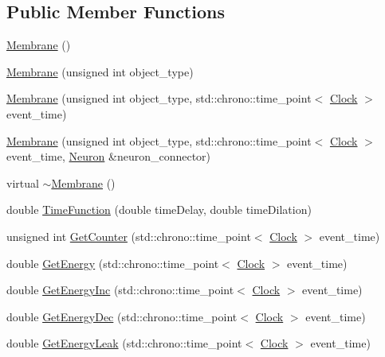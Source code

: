 \subsection*{Public Member Functions}
\begin{DoxyCompactItemize}
\item 
\hyperlink{class_membrane_ae3db1e55d9a535226bfd41c2a9ac1f0c}{Membrane} ()
\item 
\hyperlink{class_membrane_a9e45fcb5a4e791f2697fce4d9fa78a3f}{Membrane} (unsigned int object\+\_\+type)
\item 
\hyperlink{class_membrane_afeb8292866a69bdc2b9be6dcd902b519}{Membrane} (unsigned int object\+\_\+type, std\+::chrono\+::time\+\_\+point$<$ \hyperlink{universe_8h_a0ef8d951d1ca5ab3cfaf7ab4c7a6fd80}{Clock} $>$ event\+\_\+time)
\item 
\hyperlink{class_membrane_a8d61894d90a7f63e427cd8b1a5eca380}{Membrane} (unsigned int object\+\_\+type, std\+::chrono\+::time\+\_\+point$<$ \hyperlink{universe_8h_a0ef8d951d1ca5ab3cfaf7ab4c7a6fd80}{Clock} $>$ event\+\_\+time, \hyperlink{class_neuron}{Neuron} \&neuron\+\_\+connector)
\item 
virtual \hyperlink{class_membrane_a8765daf8038c1e992e3ea3752db0042f}{$\sim$\+Membrane} ()
\item 
double \hyperlink{class_membrane_a8c3593b0747495c412bf2d99b7b10104}{Time\+Function} (double time\+Delay, double time\+Dilation)
\item 
unsigned int \hyperlink{class_membrane_a85f8b2633ff32f79b6fbb466ce690858}{Get\+Counter} (std\+::chrono\+::time\+\_\+point$<$ \hyperlink{universe_8h_a0ef8d951d1ca5ab3cfaf7ab4c7a6fd80}{Clock} $>$ event\+\_\+time)
\item 
double \hyperlink{class_membrane_a50d39c596daa7af8da7dd7215d3a32ba}{Get\+Energy} (std\+::chrono\+::time\+\_\+point$<$ \hyperlink{universe_8h_a0ef8d951d1ca5ab3cfaf7ab4c7a6fd80}{Clock} $>$ event\+\_\+time)
\item 
double \hyperlink{class_membrane_a00e038f0023186139467d490c6cd38a3}{Get\+Energy\+Inc} (std\+::chrono\+::time\+\_\+point$<$ \hyperlink{universe_8h_a0ef8d951d1ca5ab3cfaf7ab4c7a6fd80}{Clock} $>$ event\+\_\+time)
\item 
double \hyperlink{class_membrane_a874068c028004d4dde7ec41d999872eb}{Get\+Energy\+Dec} (std\+::chrono\+::time\+\_\+point$<$ \hyperlink{universe_8h_a0ef8d951d1ca5ab3cfaf7ab4c7a6fd80}{Clock} $>$ event\+\_\+time)
\item 
double \hyperlink{class_membrane_ac6c8d1f7348b24e448e8163260500b89}{Get\+Energy\+Leak} (std\+::chrono\+::time\+\_\+point$<$ \hyperlink{universe_8h_a0ef8d951d1ca5ab3cfaf7ab4c7a6fd80}{Clock} $>$ event\+\_\+time)

\end{DoxyCompactItemize}
